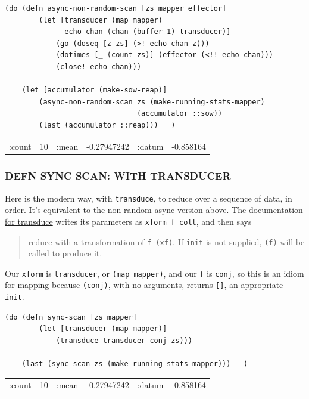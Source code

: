\documentclass[10pt,oneside,x11names]{article}
\begin{document}
\begin{verbatim}
(do (defn async-non-random-scan [zs mapper effector]
        (let [transducer (map mapper)
              echo-chan (chan (buffer 1) transducer)]
            (go (doseq [z zs] (>! echo-chan z)))
            (dotimes [_ (count zs)] (effector (<!! echo-chan)))
            (close! echo-chan)))

    (let [accumulator (make-sow-reap)]
        (async-non-random-scan zs (make-running-stats-mapper)
                               (accumulator ::sow))
        (last (accumulator ::reap)))   )
\end{verbatim}

\begin{center}
\begin{tabular}{lrlrlr}
:count & 10 & :mean & -0.27947242 & :datum & -0.858164\\
\end{tabular}
\end{center}

\subsubsection{DEFN SYNC SCAN: WITH TRANSDUCER}
\label{sync-scan-with-transducer}
Here is the modern way, with \texttt{transduce}, to reduce over a sequence of
data, in order. It's equivalent to the non-random async version above.
The \href{https://clojuredocs.org/clojure.core/transduce}{documentation for
transduce} writes its parameters as \texttt{xform f coll}, and then says

\begin{quote}
reduce with a transformation of \texttt{f (xf)}. If \texttt{init} is not supplied,
\texttt{(f)} will be called to produce it.
\end{quote}

Our \texttt{xform} is \texttt{transducer}, or \texttt{(map mapper)}, and our \texttt{f} is \texttt{conj},
so this is an idiom for mapping because \texttt{(conj)}, with no arguments,
returns \texttt{[]}, an appropriate \texttt{init}.

\begin{verbatim}
(do (defn sync-scan [zs mapper]
        (let [transducer (map mapper)]
            (transduce transducer conj zs)))

    (last (sync-scan zs (make-running-stats-mapper)))   )
\end{verbatim}

\begin{center}
\begin{tabular}{lrlrlr}
:count & 10 & :mean & -0.27947242 & :datum & -0.858164\\
\end{tabular}
\end{center}
\end{document}

